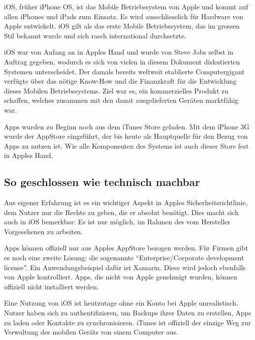 iOS, früher iPhone OS, ist das Mobile Betriebssystem von Apple und kommt auf allen iPhones und iPads zum Einsatz. Es wird ausschliesslich für Hardware von Apple entwickelt\thinspace\cite{online:ios-wikipedia}. iOS gilt als das erste Mobile Betriebssystem, das im grossen Stil bekannt wurde und sich rasch international durchsetzte.

iOS war von Anfang an in Apples Hand und wurde von Steve Jobs selbst in Auftrag gegeben, wodurch es sich von vielen in diesem Dokument diskutierten Systemen unterscheidet\thinspace\cite{online:ios-wikipedia}. Der damals bereits weltweit etablierte Computergigant verfügte über das nötige \mbox{Know-How} und die Finanzkraft für die Entwicklung dieses Mobilen Betriebssystems. Ziel war es, ein kommerzielles Produkt zu schaffen, welches zusammen mit den damit ausgelieferten Geräten marktfähig war.

Apps wurden zu Beginn noch aus dem iTunes Store geladen\thinspace\cite{online:ios-appstore}. Mit dem iPhone 3G wurde der AppStore eingeführt, der bis heute als Hauptquelle für den Bezug von Apps zu nutzen ist. Wie alle Komponenten des Systems ist auch dieser Store fest in Apples Hand.
\newline

\subsection{So geschlossen wie technisch machbar}
Aus eigener Erfahrung ist es ein wichtiger Aspekt in Apples Sicherheitsrichtlinie, dem Nutzer nur die Rechte zu geben, die er absolut benötigt. Dies macht sich auch in iOS bemerkbar: Es ist nur möglich, im Rahmen des vom Hersteller Vorgesehenen zu arbeiten.

Apps können offiziell nur aus Apples AppStore bezogen werden. Für Firmen gibt es noch eine zweite Lösung: die sogenannte ``Enterprise/Corporate development license''. Ein Anwendungsbeispiel dafür ist Xamarin\thinspace\cite{online:ios-xamarin}. Diese wird jedoch ebenfalls von Apple kontrolliert\thinspace\cite{online:ios-appsfromoutside}. Apps, die nicht von Apple genehmigt wurden, können offiziell nicht installiert werden\thinspace\cite{online:ios-appstore}.

Eine Nutzung von iOS ist heutzutage ohne ein Konto bei Apple unrealistisch. Nutzer haben sich zu authentifizieren, um Backups ihrer Daten zu erstellen, Apps zu laden oder Kontakte zu synchronisieren. iTunes ist offiziell der einzige Weg zur Verwaltung des mobilen Geräts von einem Computer aus.

